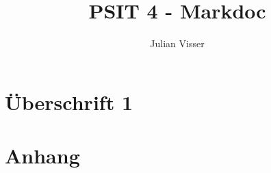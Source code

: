 \documentclass[a4paper, 12pt]{article}
\title{PSIT 4 - Markdoc}
\author{Julian Visser}
\begin{document}
	
	\begin{titlepage}
		\maketitle
	\end{titlepage}


	\newpage
	\tableofcontents
	
	\newpage
	
	\section{Überschrift 1}
	
	
	\newpage
	
	\section{Anhang}
	
	\listoffigures
	\listoftables
	\printbibliography  %
	
\end{document}
